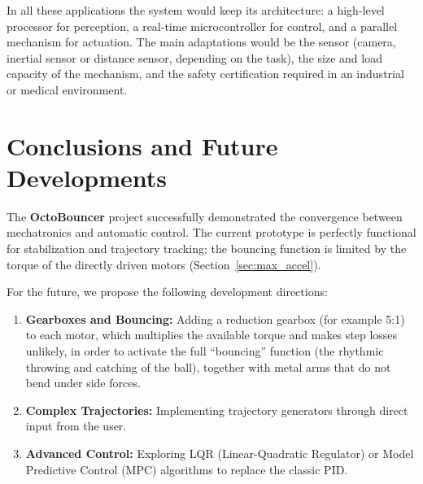 \documentclass[12pt,a4paper]{report}
\begin{document}
In all these applications the system would keep its architecture: a high-level processor for perception, a real-time microcontroller for control, and a parallel mechanism for actuation. The main adaptations would be the sensor (camera, inertial sensor or distance sensor, depending on the task), the size and load capacity of the mechanism, and the safety certification required in an industrial or medical environment.

\section{Conclusions and Future Developments}
The \textbf{OctoBouncer} project successfully demonstrated the convergence between mechatronics and automatic control. The current prototype is perfectly functional for stabilization and trajectory tracking; the bouncing function is limited by the torque of the directly driven motors (Section~\ref{sec:max_accel}).

For the future, we propose the following development directions:
    \begin{enumerate}
        \item \textbf{Gearboxes and Bouncing:} Adding a reduction gearbox (for example 5:1) to each motor, which multiplies the available torque and makes step losses unlikely, in order to activate the full ``bouncing'' function (the rhythmic throwing and catching of the ball), together with metal arms that do not bend under side forces.
    \item \textbf{Complex Trajectories:} Implementing trajectory generators through direct input from the user.
    \item \textbf{Advanced Control:} Exploring LQR (Linear-Quadratic Regulator) or Model Predictive Control (MPC) algorithms to replace the classic PID.
\end{enumerate}

\end{document}
